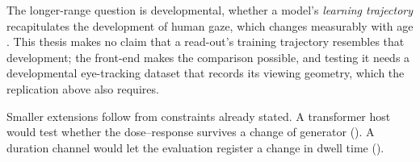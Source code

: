 The longer-range question is developmental, whether a model's \emph{learning trajectory} recapitulates
the development of human gaze, which changes measurably with age
\citep{helo2014maturation, acik2010developmental}. This thesis makes no claim that a read-out's training
trajectory resembles that development; the front-end makes the comparison possible, and testing it needs
a developmental eye-tracking dataset that records its viewing geometry, which the replication above also
requires.

Smaller extensions follow from constraints already stated. A transformer host would test whether the dose--response
survives a change of generator (). A duration channel would let the evaluation register
a change in dwell time ().
